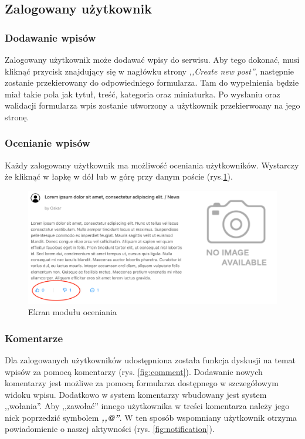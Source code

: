 \documentclass[declaration,shortabstract]{iithesis}
\begin{document}
\subsection{Zalogowany użytkownik}

\subsubsection{Dodawanie wpisów}
Zalogowany użytkownik może dodawać wpisy do serwisu. Aby tego dokonać, musi kliknąć przycisk znajdujący się w nagłówku strony \textit{,,Create new post''}, następnie zostanie przekierowany do odpowiedniego formularza. Tam do wypełnienia będzie miał takie pola jak tytuł, treść, kategoria oraz miniaturka. Po wysłaniu oraz walidacji formularza wpis zostanie utworzony a użytkownik przekierwoany na jego stronę.

\subsubsection{Ocenianie wpisów}
Każdy zalogowany użytkownik ma możliwość oceniania użytkowników. Wystarczy że kliknąć w łapkę w dół lub w górę przy danym poście (rys.\ref{fig:like}). 
\begin{figure}
    \centering
    \includegraphics[width=\linewidth]{images/like.png}
    \caption{Ekran modułu oceniania}
    \label{fig:like}
\end{figure}

\subsubsection{Komentarze}
Dla zalogowanych użytkowników udostępniona została funkcja dyskusji na temat wpisów za pomocą komentarzy (rys. \ref{fig:comment}). Dodawanie nowych komentarzy jest możliwe za pomocą formularza dostępnego w szczegółowym widoku wpisu. Dodatkowo w system komentarzy wbudowany jest system ,,wołania''. Aby ,,zawołać'' innego użytkownika w treści komentarza należy jego nick poprzedzić symbolem \textbf{\textit{,,@''}}. W ten sposób wspomniany użytkownik otrzyma powiadomienie o naszej aktywności (rys. \ref{fig:notification}).
\end{document}
